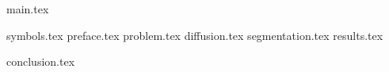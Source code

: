 

\usepackage{cmll}
\usepackage{lastpage}
\usepackage{pdfpages}
\usepackage{xassoccnt}

\usepackage{totcount}
\def\oldcite{}
\let\oldcite=\bibcite
\def\bibcite{\stepcounter{citenum}\oldcite}






\clearpage
{}
{main.tex}

\tableofcontents

\clearpage
{}
\pagestyle{fancy}
\setcounter{page}{9}

\clearpage

{symbols.tex}
{preface.tex}
{problem.tex}
{diffusion.tex}
{segmentation.tex}
{results.tex}

{conclusion.tex}

\clearpage
{}
{}
\renewcommand\bibname{Перелік посилань}



